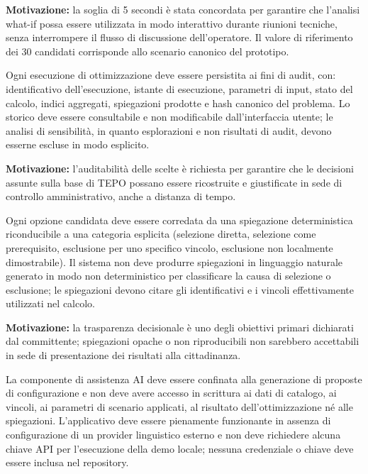 \textbf{Motivazione:} la soglia di 5 secondi è stata concordata per garantire che l'analisi what-if possa essere utilizzata in modo interattivo durante riunioni tecniche, senza interrompere il flusso di discussione dell'operatore. Il valore di riferimento dei 30 candidati corrisponde allo scenario canonico del prototipo.

 \label{rnf:tracciabilita}
Ogni esecuzione di ottimizzazione deve essere persistita ai fini di audit, con: identificativo dell'esecuzione, istante di esecuzione, parametri di input, stato del calcolo, indici aggregati, spiegazioni prodotte e hash canonico del problema. Lo storico deve essere consultabile e non modificabile dall'interfaccia utente; le analisi di sensibilità, in quanto esplorazioni e non risultati di audit, devono esserne escluse in modo esplicito.

\textbf{Motivazione:} l'auditabilità delle scelte è richiesta per garantire che le decisioni assunte sulla base di TEPO possano essere ricostruite e giustificate in sede di controllo amministrativo, anche a distanza di tempo.

 \label{rnf:interpretabilita}
Ogni opzione candidata deve essere corredata da una spiegazione deterministica riconducibile a una categoria esplicita (selezione diretta, selezione come prerequisito, esclusione per uno specifico vincolo, esclusione non localmente dimostrabile). Il sistema non deve produrre spiegazioni in linguaggio naturale generato in modo non deterministico per classificare la causa di selezione o esclusione; le spiegazioni devono citare gli identificativi e i vincoli effettivamente utilizzati nel calcolo.

\textbf{Motivazione:} la trasparenza decisionale è uno degli obiettivi primari dichiarati dal committente; spiegazioni opache o non riproducibili non sarebbero accettabili in sede di presentazione dei risultati alla cittadinanza.

 \label{rnf:ai_isolamento}
La componente di assistenza AI deve essere confinata alla generazione di proposte di configurazione e non deve avere accesso in scrittura ai dati di catalogo, ai vincoli, ai parametri di scenario applicati, al risultato dell'ottimizzazione né alle spiegazioni. L'applicativo deve essere pienamente funzionante in assenza di configurazione di un provider linguistico esterno e non deve richiedere alcuna chiave API per l'esecuzione della demo locale; nessuna credenziale o chiave deve essere inclusa nel repository.

